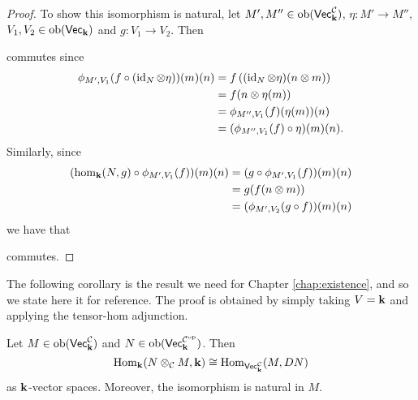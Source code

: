 \begin{proof}
    To show this isomorphism is natural, let $M',M''\in\operatorname{ob}(\normalfont\mathsf{Vec}_{\mathbf{k}}^{\mathcal{C}})$, $\eta\colon M'\to M''$, $V_1,V_2\in\operatorname{ob}(\normalfont\mathsf{Vec}_{\mathbf{k}})$ and $g:V_1\to V_2$.
    Then
    \begin{center}
    \end{center}
    commutes since
    \begin{align*}
        \phi_{M', V_1}(f\circ(\operatorname{id}_N\otimes\eta))(m)(n)&=f\left((\operatorname{id}_N\otimes\eta)(n\otimes m)\right)\\
        &=f(n\otimes\eta(m))\\
        &=\phi_{M'', V_1}(f)(\eta(m))(n)\\
        &=(\phi_{M'', V_1}(f)\circ\eta)(m)(n).
    \end{align*}
    Similarly, since
    \begin{align*}
        (\hom_{\mathbf{k}}(N,g)\circ\phi_{M', V_1}(f))(m)(n)&=(g\circ\phi_{M', V_1}(f))(m)(n)\\
        &=g(f(n\otimes m))\\
        &=(\phi_{M', V_2}(g\circ f))(m)(n)
    \end{align*}
    we have that
    \begin{center}
    \end{center}
    commutes.
\end{proof}
The following corollary is the result we need for Chapter \ref{chap:existence}, and so we state here it for reference. 
The proof is obtained by simply taking $V=\mathbf{k}$ and applying the tensor-hom adjunction.
\begin{corollary}\label{cor:tensorHomAdjunction}
    Let $M\in\operatorname{ob}(\normalfont\mathsf{Vec}_{\mathbf{k}}^{\mathcal{C}})$ and $N\in\operatorname{ob}(\normalfont\mathsf{Vec}_{\mathbf{k}}^{\mathcal{C}^{\text{op}}})$. Then
    \[ \operatorname{Hom}_{\mathbf{k}}(N\otimes_{\mathcal{C}} M,\mathbf{k})\cong\operatorname{Hom}_{\normalfont\mathsf{Vec}_{\mathbf{k}}^{\mathcal{C}}}(M, DN) \]
    as $\mathbf{k}$-vector spaces. Moreover, the isomorphism is natural in $M$.
\end{corollary}
